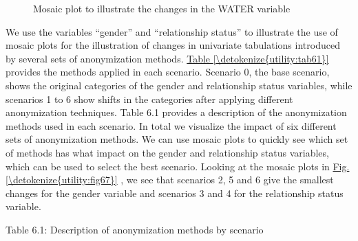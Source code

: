 \documentclass[letterpaper,10pt,english]{sphinxmanual}
\begin{document}
\begin{figure}[htbp]
\centering
\capstart

\noindent{}
\caption{Mosaic plot to illustrate the changes in the WATER variable}\label{\detokenize{utility:fig66}}\label{\detokenize{utility:id8}}\end{figure}

We use the variables “gender” and “relationship status” to illustrate
the use of mosaic plots for the illustration of changes in univariate
tabulations introduced by several sets of anonymization methods. \hyperref[\detokenize{utility:tab61}]{Table \ref{\detokenize{utility:tab61}}}
provides the methods applied in each scenario. Scenario 0, the base
scenario, shows the original categories of the gender and relationship
status variables, while scenarios 1 to 6 show shifts in the categories
after applying different anonymization techniques. Table 6.1 provides a
description of the anonymization methods used in each scenario. In total
we visualize the impact of six different sets of anonymization methods.
We can use mosaic plots to quickly see which set of methods has what
impact on the gender and relationship status variables, which can be
used to select the best scenario. Looking at the mosaic plots in \hyperref[\detokenize{utility:fig67}]{Fig.\@ \ref{\detokenize{utility:fig67}}} ,
we see that scenarios 2, 5 and 6 give the smallest changes for the
gender variable and scenarios 3 and 4 for the relationship status
variable.

Table 6.1: Description of anonymization methods by scenario
\end{document}
